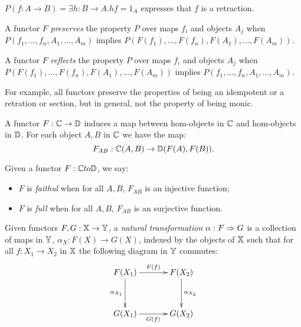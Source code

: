 \begin{example}
  $P(f:A \to B) = \exists h : B \to A. h f = 1_A$ expresses that $f$ is a retraction.
\end{example}

\begin{definition}\label{def:functor_preserving_a_property}
  A functor $F$ \emph{preserves} the property $P$ over maps $f_i$ and objects $A_j$ when
  $P(f_1,\ldots,f_n, A_1,\ldots,A_m)$ implies $P(F(f_1),\ldots,F(f_n), F(A_1),\ldots,F(A_m))$.
\end{definition}

\begin{definition}\label{def:functor_reflects_a_property}
  A functor $F$ \emph{reflects} the property $P$ over maps $f_i$ and objects $A_j$ when
  $P(F(f_1),\ldots,F(f_n), F(A_1),\ldots,F(A_m))$ implies $P(f_1,\ldots,f_n, A_1,\ldots,A_m)$.
\end{definition}

For example, all functors preserve the properties of being an idempotent or a retration or section,
but in general, not the property of being monic.

A functor $F:\mathbb{C} \to \mathbb{D}$ induces a map between hom-objects in $\mathbb{C}$ and hom-objects in $\mathbb{D}$. For
each object $A,B$ in $\mathbb{C}$ we have the map:
\[
  F_{AB} : \mathbb{C}(A,B) \to \mathbb{D}(F(A),F(B)).
\]

\begin{definition}\label{def:full_functor_faithful_functor}
  Given a functor $F:\mathbb{C} to \mathbb{D}$, we say:
  \begin{itemize}
    \item $F$ is \emph{faithul} when for all $A,B$, $F_{AB}$ is an injective function;
    \item $F$ is \emph{full} when  for all $A,B$, $F_{AB}$ is an surjective function.
  \end{itemize}
\end{definition}



\begin{definition}\label{def:natural_transformation}
  Given functors $F,G:\mathbb{X} \to \mathbb{Y}$, a \emph{natural transformation} $\alpha:F \Rightarrow G$ is a collection
  of maps in $\mathbb{Y}$, $\alpha_X : F(X) \to G(X)$, indexed by the objects of $\mathbb{X}$ such that for all
  $f:X_1 \to X_2$ in $\mathbb{X}$ the following diagram in $\mathbb{Y}$ commutes:
  \[\xymatrix @R+10pt @C+10pt{
      F(X_1) \ar[r]^{F(f)} \ar[d]_{\alpha_{X_1}} & F(X_2) \ar[d]^{\alpha_{X_2}}\\
      G(X_1) \ar[r]_{G(f)} &  G(X_2)
    }
  \]
\end{definition}

